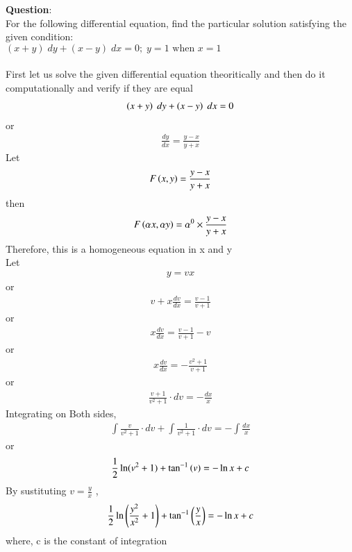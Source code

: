 \documentclass[journal]{IEEEtran}
\begin{document}
\textbf{Question}:\\
For the following differential equation, find the particular solution satisfying the given condition:\\
$(x + y)\;dy + (x - y)\;dx = 0;\;y=1 \text{ when } x=1$\\
\solution \\
First let us solve the given differential equation theoritically and then do it computationally and verify if they are equal \\
\begin{align}
    {\ensuremath{\left(x + y\right)}\;dy + \ensuremath{\left(x - y\right)}\;dx = 0}
\end{align}
or \begin{align}
    \frac{dy}{dx}=\frac{y-x}{y+x}
\end{align}
Let \begin{align}
    F\left(x,y\right)=\frac{y-x}{y+x}
\end{align}
then \begin{align}
    F\left(\alpha x,\alpha y\right)={\alpha}^0 \times \frac{y-x}{y+x}
\end{align}
Therefore, this is a homogeneous equation in x and y\\
Let \begin{align}
    y = v x 
\end{align}
or \begin{align}
    v + x \frac{dv}{dx} = \frac{v-1}{v+1}
\end{align}
or \begin{align}
    x\frac{dv}{dx}=\frac{v-1}{v+1}-v
\end{align}
or \begin{align}
    x\frac{dv}{dx}=-\frac{v^2+1}{v+1}
\end{align}
or \begin{align}
    \frac{v+1}{v^2+1}\cdot dv = -\frac{dx}{x}
\end{align}
Integrating on Both sides, \begin{align}
   \int \frac{v}{v^2+1}\cdot dv + \int\frac{1}{v^2+1}\cdot dv = -\int \frac{dx}{x}
\end{align}
or \begin{align}
    \frac{1}{2}\ln(v^2+1) + \tan^{-1}{\left(v\right)} = - \ln{x} + c
\end{align}
By sustituting $v=\frac{y}{x}$ ,
\begin{align}
    \frac{1}{2}\ln \left(\frac{y^2}{x^2}+1\right) + \tan^{-1}{\left(\frac{y}{x}\right)} = - \ln{x} + c
    \label{0.12}
\end{align}
where, c is the constant of integration
\end{document}
